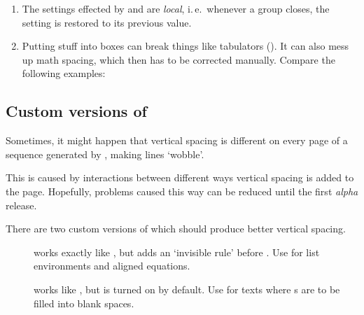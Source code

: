 \begin{slide}
  \newslide

  \begin{enumerate}
  \item The settings effected by  and  are \emph{local}, i.\,e.\ whenever
    a group closes, the setting is restored to its previous value.

  \item Putting stuff into boxes can break things like tabulators (\code{\&}). It can also mess up math spacing, which
    then has to be corrected manually. Compare the following examples:

  \end{enumerate}

  \newslide

  \subsection{Custom versions of }%
  Sometimes, it might happen that vertical spacing is different on every page of a sequence generated by
  , making lines `wobble'.

  This is caused by interactions between different ways vertical spacing is added to the page. Hopefully, problems
  caused this way can be reduced until the first \emph{alpha} release.

  \newslide

  There are two custom versions of  which should produce better vertical spacing.
  \begin{description}
  \item[]
     works exactly like , but adds
    an `invisible rule' before . Use for list environments and
    aligned equations.
  \item[]
     works like , but
     is turned on by default. Use for texts where
    s are to be filled into blank spaces.
  \end{description}


\end{slide}
